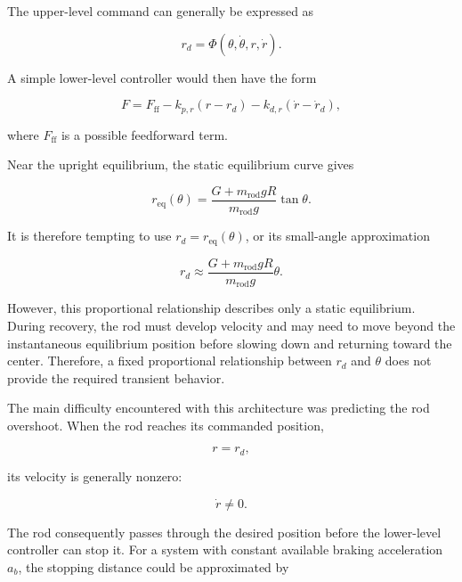 The upper-level command can generally be expressed as

\begin{equation}
r_d
=
\Phi
\left(
\theta,\dot{\theta},r,\dot{r}
\right).
\label{eq:upper-level-rod-command}
\end{equation}

A simple lower-level controller would then have the form

\begin{equation}
F
=
F_{\mathrm{ff}}
-k_{p,r}(r-r_d)
-k_{d,r}(\dot{r}-\dot{r}_d),
\label{eq:lower-level-rod-controller}
\end{equation}

where $F_{\mathrm{ff}}$ is a possible feedforward term.

Near the upright equilibrium, the static equilibrium curve gives

\begin{equation}
r_{\mathrm{eq}}(\theta)
=
\frac{G+m_{\mathrm{rod}}gR}
     {m_{\mathrm{rod}}g}
\tan\theta.
\label{eq:hierarchical-equilibrium-reference}
\end{equation}

It is therefore tempting to use $r_d=r_{\mathrm{eq}}(\theta)$, or its small-angle approximation

\begin{equation}
r_d
\approx
\frac{G+m_{\mathrm{rod}}gR}
     {m_{\mathrm{rod}}g}
\theta.
\label{eq:proportional-equilibrium-reference}
\end{equation}

However, this proportional relationship describes only a static equilibrium. During recovery, the rod must develop velocity and may need to move beyond the instantaneous equilibrium position before slowing down and returning toward the center. Therefore, a fixed proportional relationship between $r_d$ and $\theta$ does not provide the required transient behavior.

The main difficulty encountered with this architecture was predicting the rod overshoot. When the rod reaches its commanded position,

\begin{equation}
r=r_d,
\end{equation}

its velocity is generally nonzero:

\begin{equation}
\dot{r}\neq0.
\end{equation}

The rod consequently passes through the desired position before the lower-level controller can stop it. For a system with constant available braking acceleration $a_b$, the stopping distance could be approximated by

